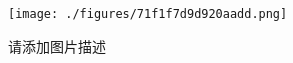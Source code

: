 
\begin{figure}[ht]
\centering
\texttt{[image: ./figures/71f1f7d9d920aadd.png]}
\caption{请添加图片描述} \label{fig_testSR_1}
\end{figure}